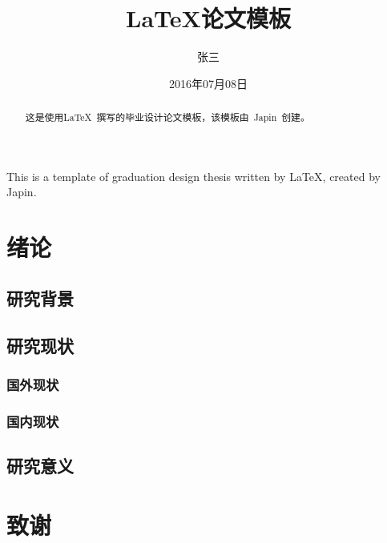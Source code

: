 \documentclass{swustthesis}
\title{\LaTeX{}论文模板}
\author{张三}
\date{2016年07月08日}
\begin{document}
\maketitle

\frontmatter

\begin{abstract}
  这是使用\LaTeX\ 撰写的毕业设计论文模板，该模板由~Japin~创建。
\end{abstract}


\begin{englishabstract}
  This is a template of graduation design thesis written by \LaTeX, created by Japin.
\end{englishabstract}


\tableofcontents

\mainmatter
\chapter{绪论}
\section{研究背景}
\section{研究现状}
\subsection{国外现状}
\subsection{国内现状}
\section{研究意义}

\backmatter
\chapter{致谢}
\end{document}
